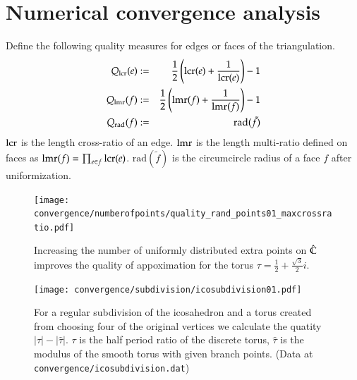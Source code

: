 \documentclass[Thesis.tex]{subfiles}
\begin{document}
\section{Numerical convergence analysis}

Define the following quality measures for edges or faces of the triangulation.
\begin{eqnarray}
	Q_{\operatorname{lcr}}(e) &:=& \frac{1}{2}\left(\operatorname{lcr}(e) + \frac{1}{\operatorname{lcr}(e)}\right) - 1\label{eq:quality_lcr}\\
	Q_{\operatorname{lmr}}(f) &:=& \frac{1}{2}\left(\operatorname{lmr}(f) + \frac{1}{\operatorname{lmr}(f)}\right) - 1\label{eq:quality_lmr}\\
	Q_{\mathrm{rad}}(f) &:=& \mathrm{rad}(\tilde{f})\label{eq:quality_rad}
\end{eqnarray}
$\operatorname{lcr}$ is the length cross-ratio of an edge. $\operatorname{lmr}$ is the length multi-ratio defined on faces as $\operatorname{lmr}(f)=\prod_{e \in f}\operatorname{lcr}(e)$. $\mathrm{rad}(\tilde{f})$ is the circumcircle radius of a face $f$ after uniformization.

\begin{figure}[h]
\centering
\texttt{[image: convergence/numberofpoints/quality\_rand\_points01\_maxcrossratio.pdf]}
\caption{Increasing the number of uniformly distributed extra points on $\hat{\mathbb C}$ improves the quality of appoximation for the torus $\tau=\frac{1}{2}+\frac{\sqrt 3}{2}i$.}
\label{fig:convergence_random}
\end{figure}

\begin{figure}[h]
\centering
\texttt{[image: convergence/subdivision/icosubdivision01.pdf]}
\caption{For a regular subdivision of the icosahedron and a torus created from choosing
four of the original vertices we calculate the quatity $|\tau|-|\hat\tau|$. $\tau$ is the 
half period ratio of the discrete torus, $\hat\tau$ is the modulus of the smooth torus
with given branch points. (Data at {\tt convergence/icosubdivision.dat})}
\label{fig:convergence_subdivision}
\end{figure}

\end{document}
